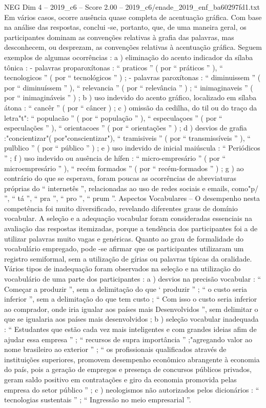 \begin{textsample}{NEG Dim 4 – 2019\_c6 – Score 2.00 – 2019\_c6/enade\_2019\_enf\_ba60297fd1.txt}
Em vários casos, ocorre ausência quase completa de acentuação gráfica.
Com base na análise das respostas, conclui -se, portanto, que, de uma maneira geral, os participantes dominam as convenções relativas à grafia das palavras, mas desconhecem, ou desprezam, as convenções relativas à acentuação gráfica.
Seguem exemplos de algumas ocorrências : a ) eliminação do acento indicador da sílaba tônica : - palavras proparoxítonas : “ praticos ” ( por “ práticos ” ), “ tecnologicos ” ( por “ tecnológicos ” ) ; - palavras paroxítonas : “ diminuissem ” ( por “ diminuíssem ” ), “ relevancia ” ( por “ relevância ” ) ; “ inimaginaveis ” ( por “ inimagináveis ” ) ; b ) uso indevido do acento gráfico, localizado em sílaba átona : “ cancêr ” ( por “ câncer ) ; c ) omissão da cedilha, do til ou do traço da letra"t": “ populacão ” ( por “ população ” ), “ especulaçoes ” ( por “ especulações ” ), “ orientacoes ” ( por “ orientações ” ) ; d ) desvios de grafia :"concientizar"( por"conscientizar"), “ tramisiveis ” ( por “ transmissíveis ” ), “ pulblico ” ( por “ público ” ) ; e ) uso indevido de inicial maiúscula : “ Periódicos ” ; f ) uso indevido ou ausência de hífen : “ micro-empresário ” ( por “ microempresário ” ), “ recém formados ” ( por “ recém-formados ” ) ; g ) ao contrário do que se esperava, foram poucas as ocorrências de abreviaturas próprias do “ internetês ”, relacionadas ao uso de redes sociais e emails, como"p/ ”, “ tá ”, “ pra ”, “ pro ”, “ prum ”.
Aspectos Vocabulares – O desempenho nesta competência foi muito diversificado, revelando diferentes graus de domínio vocabular.
A seleção e a adequação vocabular foram consideradas essenciais na avaliação das respostas itemizadas, porque a tendência dos participantes foi a de utilizar palavras muito vagas e genéricas.
Quanto ao grau de formalidade do vocabulário empregado, pode -se afirmar que os participantes utilizaram um registro semiformal, sem a utilização de gírias ou palavras típicas da oralidade.
Vários tipos de inadequação foram observados na seleção e na utilização do vocabulário de uma parte dos participantes : a ) desvios na precisão vocabular : “ Começar a produzir ”, sem a delimitação do que ‘ produzir ” ; “ o custo seria inferior ”, sem a delimitação do que tem custo ; “ Com isso o custo seria inferior ao comprador, onde iria igualar aos países mais Desenvolvidos ”, sem delimitar o que se igualaria aos países mais desenvolvidos ; b ) seleção vocabular inadequada : “ Estudantes que estão cada vez mais inteligentes e com grandes ideias afim de ajudar essa empresa ” ; “ recursos de supra importância ” ;"agregando valor ao nome brasileiro ao exterior ” ; “ os profissionais qualificados através de instituições superiores, promovem desempenho econômico abrangente à economia do país, pois a geração de empregos e presença de concursos públicos privados, geram saldo positivo em contratações e giro da economia promovida pelas empresa do setor público ” ; c ) neologismos não autorizados pelos dicionários : “ tecnologias sustentais ” ; “ Ingressão no meio empresarial ”.

\end{textsample}
